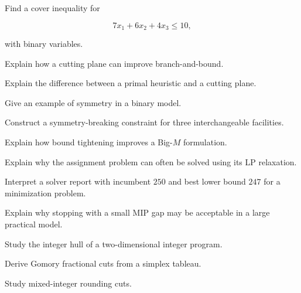 \begin{exercise}[3]
Find a cover inequality for

\[
7x_1+6x_2+4x_3\leq10,
\]

with binary variables.
\end{exercise}

\begin{exercise}[3]
Explain how a cutting plane can improve branch-and-bound.
\end{exercise}

\begin{exercise}[3]
Explain the difference between a primal heuristic and a cutting plane.
\end{exercise}

\begin{exercise}[3]
Give an example of symmetry in a binary model.
\end{exercise}

\begin{exercise}[3]
Construct a symmetry-breaking constraint for three interchangeable
facilities.
\end{exercise}

\begin{exercise}[3]
Explain how bound tightening improves a Big-\(M\) formulation.
\end{exercise}

\begin{exercise}[3]
Explain why the assignment problem can often be solved using its LP
relaxation.
\end{exercise}

\begin{exercise}[3]
Interpret a solver report with incumbent \(250\) and best lower bound
\(247\) for a minimization problem.
\end{exercise}

\begin{exercise}[3]
Explain why stopping with a small MIP gap may be acceptable in a large
practical model.
\end{exercise}

\begin{exercise}[4]
Study the integer hull of a two-dimensional integer program.
\end{exercise}

\begin{exercise}[4]
Derive Gomory fractional cuts from a simplex tableau.
\end{exercise}

\begin{exercise}[4]
Study mixed-integer rounding cuts.
\end{exercise}

